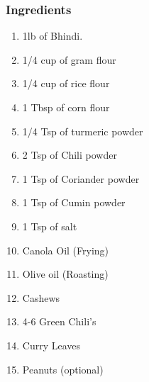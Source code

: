 \documentclass[11pt]{article}
\begin{document}
\subsubsection*{Ingredients}
\label{sec:org341a5f3}
\begin{enumerate}
\item 1lb of Bhindi.
\item 1/4 cup of gram flour
\item 1/4 cup of rice flour
\item 1 Tbsp of corn flour
\item 1/4 Tsp of turmeric powder
\item 2 Tsp of Chili powder
\item 1 Tsp of Coriander powder
\item 1 Tsp of Cumin powder
\item 1 Tsp of salt
\item Canola Oil (Frying)
\item Olive oil (Roasting)
\item Cashews
\item 4-6 Green Chili's
\item Curry Leaves
\item Peanuts (optional)
\end{enumerate}
\end{document}
